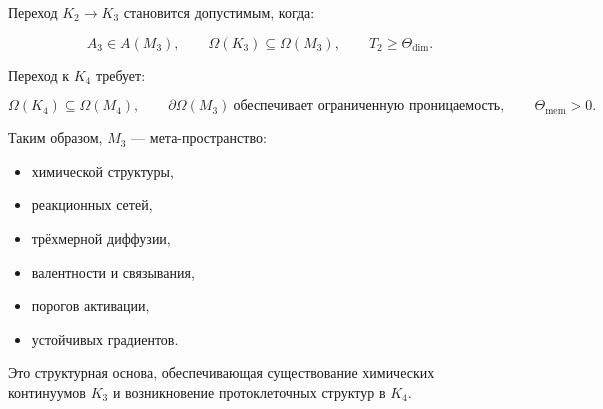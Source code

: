 Переход $K_2 \to K_3$ становится допустимым, когда:

\[
A_3 \in A(M_3),
\qquad
\Omega(K_3) \subseteq \Omega(M_3),
\qquad
T_2 \ge \Theta_{\mathrm{dim}}.
\]

Переход к $K_4$ требует:

\[
\Omega(K_4) \subseteq \Omega(M_4),
\qquad
\partial\Omega(M_3) \ \text{обеспечивает ограниченную проницаемость},
\qquad
\Theta_{\mathrm{mem}} > 0.
\]

Таким образом, $M_3$ — мета-пространство:

\begin{itemize}
    \item химической структуры,
    \item реакционных сетей,
    \item трёхмерной диффузии,
    \item валентности и связывания,
    \item порогов активации,
    \item устойчивых градиентов.
\end{itemize}

Это структурная основа, обеспечивающая существование химических континуумов $K_3$
и возникновение протоклеточных структур в $K_4$.
